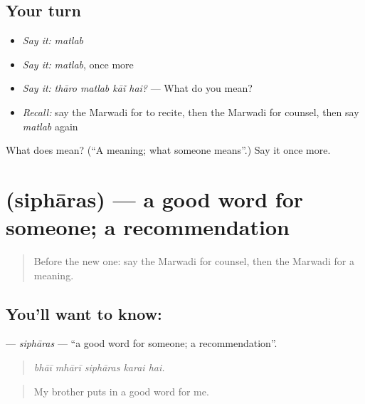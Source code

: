 \subsection*{Your turn}
\begin{itemize}
\raggedright
  \item \emph{Say it:} \emph{matlab}
  \item \emph{Say it:} \emph{matlab}, once more
  \item \emph{Say it:} \emph{thāro matlab kāĩ hai?} — What do you mean?
  \item \emph{Recall:} say the Marwadi for to recite, then the Marwadi for counsel, then say \emph{matlab} again
\end{itemize}

\begin{tcolorbox}[breakable,colback=teal!4,colframe=teal!35!black,title={Before you move on}]
What does  mean? (\textquotedblleft{}A meaning; what someone means\textquotedblright{}.) Say it once more.
\end{tcolorbox}
\section[\texorpdfstring{\mw{सिफारस} (siphāras)}{सिफारस (siphāras)}]{ (siphāras) — a good word for someone; a recommendation}

\label{lesson:MW-C268-sipharas}



\begin{quote}
Before the new one: say the Marwadi for counsel, then the Marwadi for a meaning.
\end{quote}

\subsection*{You'll want to know: }
\textbf{} — \emph{siphāras} — \textquotedblleft{}a good word for someone; a recommendation\textquotedblright{}.

\begin{quote}
    
\end{quote}

\begin{quote}
\emph{bhāī mhārī siphāras karai hai.}
\end{quote}

\begin{quote}
My brother puts in a good word for me.
\end{quote}

